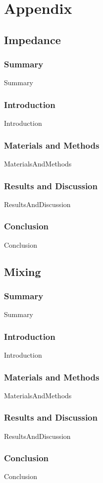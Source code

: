 \documentclass[12pt,a4paper]{article}
\begin{document}
	\section{Appendix}
	\subsection{Impedance}
    \subsubsection{Summary}
        {Summary}
    \subsubsection{Introduction}
        {Introduction}
    \subsubsection{Materials and Methods}
        {MaterialsAndMethods}
    \subsubsection{Results and Discussion}
		{ResultsAndDiscussion}
    \subsubsection{Conclusion}
        {Conclusion}
	\subsection{Mixing}
    \subsubsection{Summary}
        {Summary}
    \subsubsection{Introduction}
        {Introduction}
    \subsubsection{Materials and Methods}
        {MaterialsAndMethods}
    \subsubsection{Results and Discussion}
		{ResultsAndDiscussion}
    \subsubsection{Conclusion}
        {Conclusion}
    
\end{document}
